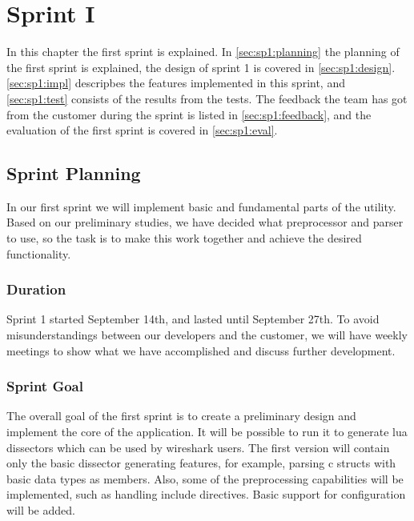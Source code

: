 \chapter{Sprint I}
In this chapter the first sprint is explained. In \autoref{sec:sp1:planning} 
the planning of the first sprint is explained, the design of sprint 1 is 
covered in \autoref{sec:sp1:design}. \autoref{sec:sp1:impl} descripbes the 
features implemented in this sprint, and \autoref{sec:sp1:test} consists of 
the results from the tests. The feedback the team has got from the customer 
during the sprint is listed in \autoref{sec:sp1:feedback}, and the evaluation 
of the first sprint is covered in \autoref{sec:sp1:eval}.

\section{Sprint Planning}
\label{sec:sp1:planning}
In our first sprint we will implement basic and fundamental parts of the
\gls{utility}. Based on our preliminary studies, we have decided what \gls{preprocessor}
and \gls{parser} to use, so the task is to make this work together and achieve the
desired functionality.

\subsection{Duration}
Sprint 1 started September 14th, and lasted until September 27th. To avoid
misunderstandings between our developers and the customer, we will have weekly
meetings to show what we have accomplished and discuss further development. 

\subsection{Sprint Goal}
The overall goal of the first sprint is to create a preliminary design and
implement the core of the application. It will be possible to run it to
generate \Gls{lua} \glspl{dissector} which can be used by \Gls{wireshark} users. The first
version will contain only the basic \gls{dissector} generating features, for example,
parsing \Gls{c} \glspl{struct} with basic data types as \glspl{member}. Also, some of the
preprocessing capabilities will be implemented, such as handling \gls{include}
directives. Basic support for configuration will be added.

